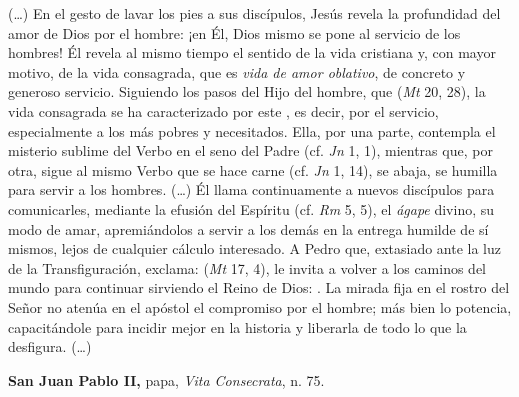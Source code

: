 \begin{patercite}
(\ldots) En el gesto de lavar los pies a sus discípulos, Jesús revela la profundidad del amor de Dios por el hombre: ¡en Él, Dios mismo se pone al servicio de los hombres! Él revela al mismo tiempo el sentido de la vida cristiana y, con mayor motivo, de la vida consagrada, que es \textit{vida de amor oblativo}, de concreto y generoso servicio. Siguiendo los pasos del Hijo del hombre, que  (\textit{Mt} 20, 28), la vida consagrada se ha caracterizado por este , es decir, por el servicio, especialmente a los más pobres y necesitados. Ella, por una parte, contempla el misterio sublime del Verbo en el seno del Padre (cf. \textit{Jn} 1, 1), mientras que, por otra, sigue al mismo Verbo que se hace carne (cf. \textit{Jn} 1, 14), se abaja, se humilla para servir a los hombres. (\ldots) Él llama continuamente a nuevos discípulos para comunicarles, mediante la efusión del Espíritu (cf. \textit{Rm} 5, 5), el \textit{ágape} divino, su modo de amar, apremiándolos a servir a los demás en la entrega humilde de sí mismos, lejos de cualquier cálculo interesado. A Pedro que, extasiado ante la luz de la Transfiguración, exclama:  (\textit{Mt} 17, 4), le invita a volver a los caminos del mundo para continuar sirviendo el Reino de Dios: . La mirada fija en el rostro del Señor no atenúa en el apóstol el compromiso por el hombre; más bien lo potencia, capacitándole para incidir mejor en la historia y liberarla de todo lo que la desfigura.  (\ldots)

\textbf{San Juan Pablo II,} papa, \textit{Vita Consecrata}, n. 75.
\end{patercite}